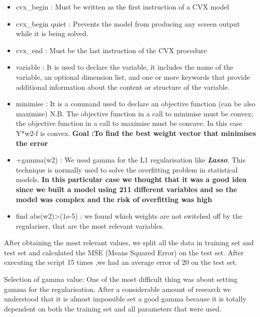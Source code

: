 \begin{itemize}
\item cvx\_begin : Must be written as the first instruction of a CVX model
\item cvx\_begin quiet : Prevents the model from producing any screen output while it is being solved.
\item cvx\_end : Must be the last instruction of the CVX procedure 
\item variable : It is used to declare the variable, it includes the name of the variable, an optional dimension list, and one or more keywords that provide additional information about the content or structure of the variable.
\item minimise : It is a command used to declare an objective function (can be also maximise) 
N.B. The objective function in a call to minimise must be convex; the objective function in a call to maximise must be concave. In this case Y*w2-f is convex.
\newline
\textbf{Goal :To find the best weight vector that minimises the error }
\item +gamma(w2) : We used gamma for the L1 regularisation like \textit{\textbf{Lasso}}. This technique is normally used to solve the overfitting problem in statistical models. \textbf{In this particular case we thought that it was a good idea since we built a model using 211 different variables and so the model was complex and the risk of overfitting was high}
\item find abs(w2)\textgreater(1e-5) : we found which weights are not switched off by the regulariser, that are the most relevant variables. 
\end{itemize}

After obtaining the most relevant values, we split all the data in training set and test set and calculated the MSE (Means Squared Error) on the test set. After executing the script 15 times ,we had an average error of 20 on the test set\cite{rossi2013exchange}. 

Selection of gamma value:
\newline
One of the most difficult thing was about setting gamma for the regularisation. After a considerable amount of research we understood that it is almost impossible set a good gamma because it is totally dependent on both the training set and all parameters that were used\cite{philip2011artificial}. 

